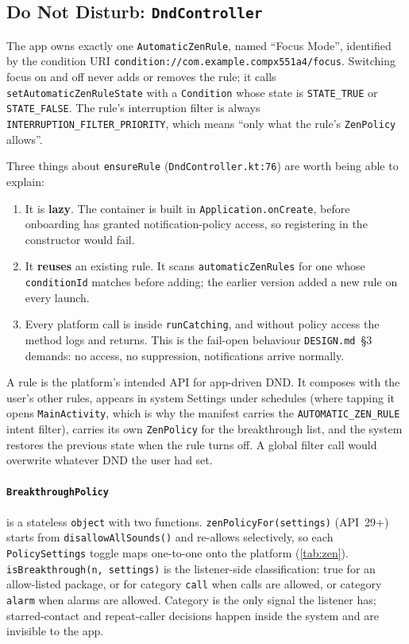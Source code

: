 \documentclass[10pt,a4paper]{article}
\newcommand{\file}[1]{\texttt{\small #1}}          %
\newcommand{\code}[1]{\texttt{#1}}                  %
\begin{document}
\subsection{Do Not Disturb: \code{DndController}}

The app owns exactly one \code{AutomaticZenRule}, named ``Focus Mode'', identified by the
condition URI \code{condition://com.example.compx551a4/focus}. Switching focus on and off never
adds or removes the rule; it calls \code{setAutomaticZenRuleState} with a \code{Condition} whose
state is \code{STATE\_TRUE} or \code{STATE\_FALSE}. The rule's interruption filter is always
\code{INTERRUPTION\_FILTER\_PRIORITY}, which means ``only what the rule's \code{ZenPolicy} allows''.

Three things about \code{ensureRule} (\file{DndController.kt:76}) are worth being able to explain:

\begin{enumerate}
\item It is \textbf{lazy}. The container is built in \code{Application.onCreate}, before onboarding
  has granted notification-policy access, so registering in the constructor would fail.
\item It \textbf{reuses} an existing rule. It scans \code{automaticZenRules} for one whose
  \code{conditionId} matches before adding; the earlier version added a new rule on every launch.
\item Every platform call is inside \code{runCatching}, and without policy access the method logs
  and returns. This is the fail-open behaviour \file{DESIGN.md}~\S3 demands: no access, no
  suppression, notifications arrive normally.
\end{enumerate}

\begin{why}[Why a zen rule rather than \code{setInterruptionFilter()}]
A rule is the platform's intended API for app-driven DND. It composes with the user's other rules,
appears in system Settings under schedules (where tapping it opens \code{MainActivity}, which is
why the manifest carries the \code{AUTOMATIC\_ZEN\_RULE} intent filter), carries its own
\code{ZenPolicy} for the breakthrough list, and the system restores the previous state when the
rule turns off. A global filter call would overwrite whatever DND the user had set.
\end{why}

\paragraph{\code{BreakthroughPolicy}} is a stateless \code{object} with two functions.
\code{zenPolicyFor(settings)} (API~29+) starts from \code{disallowAllSounds()} and re-allows
selectively, so each \code{PolicySettings} toggle maps one-to-one onto the platform
(\cref{tab:zen}). \code{isBreakthrough(n, settings)} is the listener-side classification: true for
an allow-listed package, or for category \code{call} when calls are allowed, or category
\code{alarm} when alarms are allowed. Category is the only signal the listener has; starred-contact
and repeat-caller decisions happen inside the system and are invisible to the app.
\end{document}
